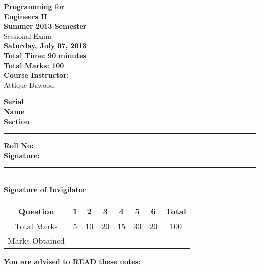 \documentclass[12pt,a4paper]{article}
\def\QOne{5}
\def\Qtwo{10}
\def\Qthree{20}
\def\Qfour{15}
\def\Qfive{30}
\def\Qsix{20}
\def\TotalMarks{100}
\begin{document}
\begin{minipage}{0.55\textwidth}
{\LARGE \textbf{Programming for\\ Engineers II}}\\[0.15cm]
{\normalsize \textbf{Summer 2013 Semester}}\\
{\Large {Sessional Exam}}\\
{\normalsize \textbf{Saturday, July 07, 2013}}\\[0.30cm]
{\Large \textbf{Total Time: 90 minutes}}\\[0.15cm]
{\Large \textbf{Total Marks: 100}}\\
\textbf{Course Instructor:}\\
Attique Dawood\\
\end{minipage}
\begin{minipage}{0.4\textwidth}
\textbf{Serial} \hrulefill \\[0.25cm]
\textbf{Name} \hrulefill\\[0.25cm]
\textbf{Section} \rule{1cm}{0.2mm} \textbf{Roll No:} \hrulefill\\[0.25cm]
\textbf{Signature:} \hrulefill\\[0.25cm]
\rule{6.6cm}{0.2mm}\\
\textbf{Signature of Invigilator}\\[0.25cm]
\end{minipage}
\begin{table}[H]
\begin{center}
\vspace{0.3cm}
	{\Large \begin{tabular}{|c|c|c|c|c|c|c|c|}
	\hline
		\rule{0pt}{2.6ex} Question & \textbf{1} & \textbf{2} & \textbf{3} & \textbf{4} & \textbf{5} & \textbf{6} & \textbf{Total}\\
		\hline
		Total Marks \rule{0pt}{2.6ex} & \QOne & \Qtwo & \Qthree & \Qfour & \Qfive & \Qsix & \TotalMarks\\
		\hline
		Marks Obtained & & & & & & &\\
	\hline
	\end{tabular}}
\end{center}
\end{table}
\noindent \textbf{You are advised to READ these notes:}
\end{document}

